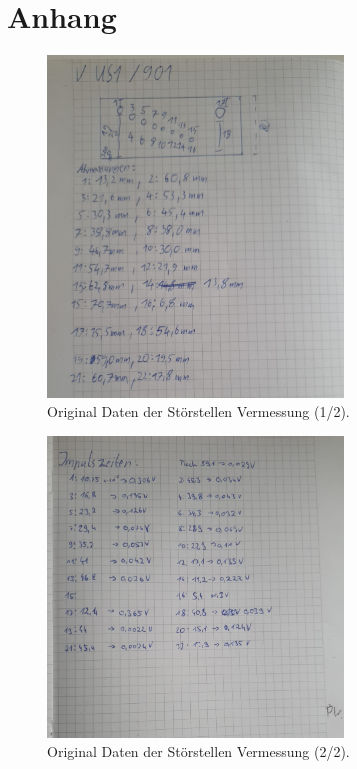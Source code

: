 \newpage
\section{Anhang}

    \begin{figure}[h]
        \centering
        \includegraphics[width=0.7\textwidth]{latex/images/Original_Daten_1.jpeg}
        \caption{Original Daten der Störstellen Vermessung (1/2).}
    \end{figure}

    \begin{figure}[h]
        \centering
        \includegraphics[width=0.7\textwidth]{latex/images/Original_Daten_2.jpeg}
        \caption{Original Daten der Störstellen Vermessung (2/2).}
    \end{figure}
